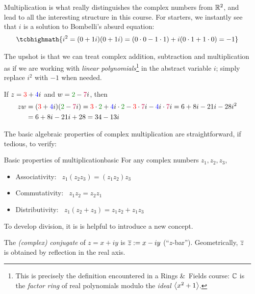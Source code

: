 
Multiplication is what really distinguishes the complex numbers from $\mathbb{R}^2$, and lead to all the interesting structure in this course. For starters, we instantly see that $i$ is a solution to Bombelli's absurd equation:
\[
	\tcbhighmath{i^2=(0+1i)(0+1i)=(0\cdot 0-1\cdot 1)+i(0\cdot 1+1\cdot 0)=-1}
\]


The upshot is that we can treat complex addition, subtraction and multiplication as if we are working with \emph{linear polynomials}\footnote{This is precisely the definition encountered in a Rings \&\ Fields course: $\mathbb{C}$ is the \emph{factor ring} of real polynomials modulo the \emph{ideal} $\left\langle x^2+1\right\rangle$.} in the abstract variable $i$; simply replace $i^2$ with $-1$ when needed.
 
\begin{example}{}{}
	If $z=\textcolor{red}{3}+\textcolor{blue}{4}i$ and $w=\textcolor{Green}{2}-\textcolor{purple}{7}i$, then
	\begin{align*}
		zw
		&= (\textcolor{red}{3}+\textcolor{blue}{4}i) (\textcolor{Green}{2}-\textcolor{purple}{7}i) = \textcolor{red}{3}\cdot \textcolor{Green}{2} + \textcolor{blue}{4}i\cdot \textcolor{Green}{2} - \textcolor{red}{3}\cdot \textcolor{purple}{7}i - \textcolor{blue}{4}i\cdot \textcolor{purple}{7}i = 6+8i-21i-28i^2\\
		&= 6+8i-21i+28=34-13i
	\end{align*}
\end{example}


The basic algebraic properties of complex multiplication are straightforward, if tedious, to verify:

\begin{lemm}{Basic properties of multiplication}{basic}
	For any complex numbers $z_1,z_2,z_3$,
	\begin{itemize}\itemsep2pt
	  \item[]Associativity: \ $z_1(z_2z_3)=(z_1z_2)z_3$
	  \item[]Commutativity: \ $z_1z_2=z_2z_1$
	  \item[]Distributivity: \ $z_1(z_2+z_3)=z_1z_2+z_1z_3$
	\end{itemize}
\end{lemm}

To develop division, it is is helpful to introduce a new concept.

\begin{defn}{}{}
	The \emph{(complex) conjugate} of $z=x+iy$ is $\overline{z}:=x-iy$ (``$z$-bar''). Geometrically, $\overline{z}$ is  obtained by reflection in the real axis.
\end{defn}

